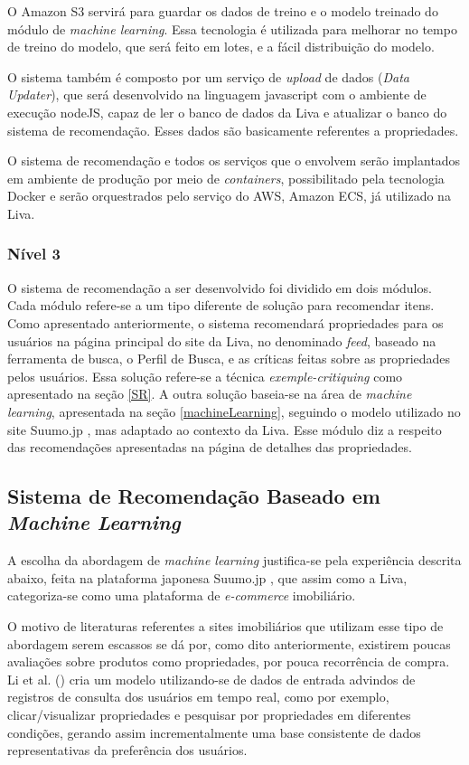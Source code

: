 O Amazon S3 servirá para guardar os dados de treino e o modelo treinado do módulo de \textit{machine learning}. Essa tecnologia é utilizada para melhorar no tempo de treino do modelo, que será feito em lotes, e a fácil distribuição do modelo.

O sistema também é composto por um serviço de \textit{upload} de dados (\textit{Data Updater}), que será desenvolvido na linguagem javascript com o ambiente de execução nodeJS, capaz de ler o banco de dados da Liva e atualizar o banco do sistema de recomendação. Esses dados são basicamente referentes a propriedades.

O sistema de recomendação e todos os serviços que o envolvem serão implantados em ambiente de produção por meio de \textit{containers}, possibilitado pela tecnologia Docker e serão orquestrados pelo serviço do AWS, Amazon ECS, já utilizado na Liva.
	
\subsubsection{Nível 3}
\label{nivel3}
O sistema de recomendação a ser desenvolvido foi dividido em dois módulos. Cada módulo refere-se a um tipo diferente de solução para recomendar itens. Como apresentado anteriormente, o sistema recomendará propriedades para os usuários na página principal do site da Liva, no denominado \textit{feed}, baseado na ferramenta de busca, o Perfil de Busca, e as críticas feitas sobre as propriedades pelos usuários. Essa solução refere-se a técnica \textit{exemple-critiquing} como apresentado na seção \ref{SR}. A outra solução baseia-se na área de \textit{machine learning}, apresentada na seção \ref{machineLearning}, seguindo o modelo utilizado no site Suumo.jp \cite{Summo:2017}, mas adaptado ao contexto da Liva. Esse módulo diz a respeito das recomendações apresentadas na página de detalhes das propriedades.

\subsection{Sistema de Recomendação Baseado em \textit{Machine Learning}}

A escolha da abordagem de \textit{machine learning} justifica-se pela experiência descrita abaixo, feita na plataforma japonesa Suumo.jp \cite{Summo:2017}, que assim como a Liva, categoriza-se como uma plataforma de \textit{e-commerce} imobiliário.

O motivo de literaturas referentes a sites imobiliários que utilizam esse tipo de abordagem serem escassos se dá por, como dito anteriormente, existirem poucas avaliações sobre produtos como propriedades, por pouca recorrência de compra. Li et al. (\citeyear{Summo:2017}) cria um modelo utilizando-se de dados de entrada advindos de registros de consulta dos usuários em tempo real, como por exemplo, clicar/visualizar propriedades e pesquisar por propriedades em diferentes condições, gerando assim incrementalmente uma base consistente de dados representativas da preferência dos usuários.


